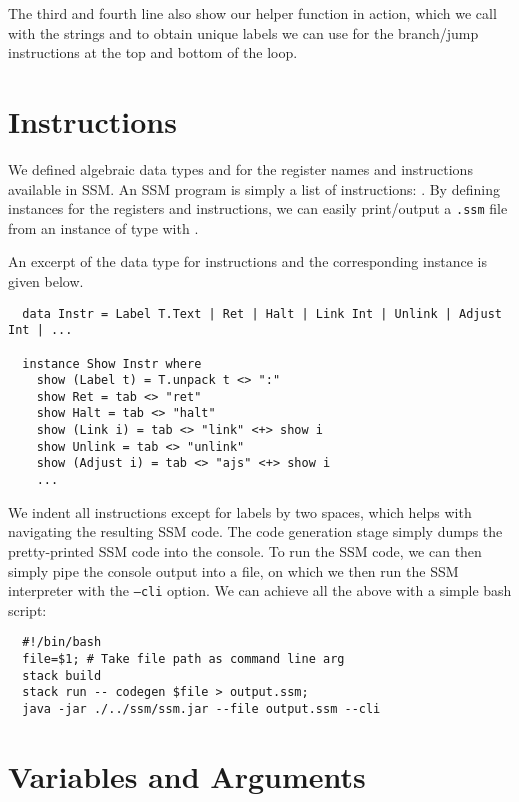 The third and fourth line also show our  helper function in
action, which we call with the strings  and 
to obtain unique labels we can use for the branch/jump instructions at the
top and bottom of the  loop.



\section{Instructions} \label{sec:codegen-instructions}

We defined algebraic data types  and  for the
register names and instructions available in SSM. An SSM program is simply a
list of instructions: .
By defining  instances for the registers and instructions, we can
easily print/output a \verb|.ssm| file from an instance of type
\haskell{[Instr]} with .

An excerpt of the data type for instructions and the corresponding 
instance is given below.

\begin{verbatim}
  data Instr = Label T.Text | Ret | Halt | Link Int | Unlink | Adjust Int | ...

  instance Show Instr where
    show (Label t) = T.unpack t <> ":"
    show Ret = tab <> "ret"
    show Halt = tab <> "halt"
    show (Link i) = tab <> "link" <+> show i
    show Unlink = tab <> "unlink"
    show (Adjust i) = tab <> "ajs" <+> show i
    ...
\end{verbatim}

We indent all instructions except for labels by two spaces, which helps with
navigating the resulting SSM code.
The code generation stage simply dumps the pretty-printed SSM code into the
console. To run the SSM code, we can then simply pipe the console output into a
file, on which we then run the SSM interpreter with the \texttt{--cli} option.
We can achieve all the above with a simple bash script:
%
\begin{verbatim}
  #!/bin/bash
  file=$1; # Take file path as command line arg
  stack build
  stack run -- codegen $file > output.ssm;
  java -jar ./../ssm/ssm.jar --file output.ssm --cli
\end{verbatim}


\section{Variables and Arguments} \label{sec:codegen-vars-args}

